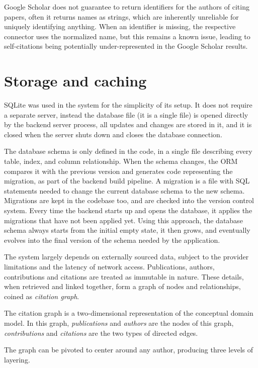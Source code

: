 \textsf{Google Scholar} does not guarantee to return identifiers for the authors of citing papers, often it returns names as strings, which are inherently unreliable for uniquely identifying anything.
When an identifier is missing, the respective connector uses the normalized name, but this remains a known issue, leading to self-citations being potentially under-represented in the \textsf{Google Scholar} results.

\section{Storage and caching} \label{sec:storage-caching}

\textsf{SQLite} was used in the system for the simplicity of its setup.
It does not require a separate server, instead the database file (it is a single file) is opened directly by the backend server process, all updates and changes are stored in it, and it is closed when the server shuts down and closes the database connection.

The database schema is only defined in the code, in a single file describing every table, index, and column relationship.
When the schema changes, the ORM compares it with the previous version and generates code representing the migration, as part of the backend build pipeline.
A migration is a file with SQL statements needed to change the current database schema to the new schema.
Migrations are kept in the codebase too, and are checked into the version control system.
Every time the backend starts up and opens the database, it applies the migrations that have not been applied yet.
Using this approach, the database schema always starts from the initial empty state, it then grows, and eventually evolves into the final version of the schema needed by the application.

The system largely depends on externally sourced data, subject to the provider limitations and the latency of network access.
Publications, authors, contributions and citations are treated as immutable in nature.
These details, when retrieved and linked together, form a graph of nodes and relationships, coined as \emph{citation graph}. 

The citation graph is a two-dimensional representation of the conceptual domain model.
In this graph, \emph{publications} and \emph{authors} are the nodes of this graph, \emph{contributions} and \emph{citations} are the two types of directed edges.

The graph can be pivoted to center around any author, producing three levels of layering.

